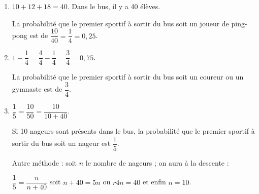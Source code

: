 
\medskip

%

\begin{enumerate}
\item %
$10 + 12 +18 = 40$. Dans le bus, il y a 40 élèves.

La probabilité que le premier sportif à sortir du bus soit un joueur de ping-pong est de
$\dfrac{10}{40} = \dfrac{1}{4}  = 0,25$.
\item %
$1 - \dfrac{1}{4}  = \dfrac{4}{4} - \dfrac{1}{4} = \dfrac{3}{4} = 0,75$.

La probabilité que le premier sportif à sortir du bus soit un coureur ou un gymnaste est de
$\dfrac{3}{4}$.
\item %

$\dfrac{1}{5} = \dfrac{10}{50} = \dfrac{10}{10+40}$.

Si 10 nageurs sont présents dans le bus, la probabilité
que le premier sportif à sortir du bus soit un nageur est
$\dfrac{1}{5}$.

Autre méthode : soit $n$ le nombre de nageurs ; on aura à la descente :

$\dfrac{1}{5} = \dfrac{n}{n + 40}$ soit $n + 40 = 5n$ ou $r4n = 40$ et enfin $n = 10$.
\end{enumerate}

\vspace{0,5cm}


